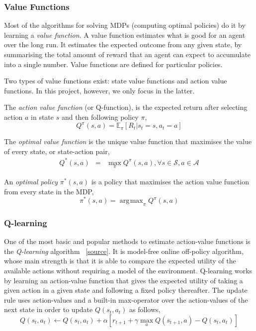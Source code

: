 \documentclass{article}
\DeclareMathOperator*{\argmax}{\arg\!\max}
\newcommand{\GithubURL}[1]{[\href{https://github.com/davidrobles/mlnd-capstone-code/blob/master/#1}{source}]}
\begin{document}
\subsubsection{Value Functions}

Most of the algorithms for solving MDPs (computing optimal policies) do it by learning a \emph{value
function}. A value function estimates what is good for an agent over the long run. It estimates the
expected outcome from any given state, by summarising the total amount of reward that an agent can
expect to accumulate into a single number. Value functions are defined for particular policies.

Two types of value functions exist: state value functions and action value functions. In this
project, however, we only focus in the latter.

The \emph{action value function} (or Q-function), is the expected return after selecting action $a$
in state $s$ and then following policy $\pi$,
%
\begin{equation}
Q^\pi(s,a) = \mathbb{E}_\pi \left[ R_t | s_t = s, a_t = a \right]
\end{equation}

The \emph{optimal value function} is the unique value function that maximises the value of every
state, or state-action pair,
%
\begin{eqnarray}
Q^*(s,a) & = & \max\limits_\pi Q^\pi(s,a), \forall s \in \mathcal{S}, a \in \mathcal{A}
\end{eqnarray}

An \emph{optimal policy} $\pi^*(s,a)$ is a policy that maximises the action value function from
every state in the MDP,
%
\begin{equation}
    \pi^*(s,a) = \argmax_\pi Q^\pi(s, a)
\end{equation}

\subsubsection{Q-learning}

One of the most basic and popular methods to estimate action-value functions is the
\emph{Q-learning} algorithm~\citep{Watkins1989PhD} \GithubURL{capstone/rl/learners/qlearning.py}.
It is model-free online off-policy algorithm, whose main strength is that it is able to compare the
expected utility of the available actions without requiring a model of the environment. Q-learning
works by learning an action-value function that gives the expected utility of taking a given action
in a given state and following a fixed policy thereafter. The update rule uses action-values and a
built-in max-operator over the action-values of the next state in order to update $Q(s_t, a_t)$ as
follows,
%
\begin{equation} Q(s_t, a_t) \gets Q(s_t, a_t) + \alpha [r_{t+1} + \gamma \max_a Q(s_{t+1}, a) -
Q(s_t, a_t)] \end{equation}
\end{document}

